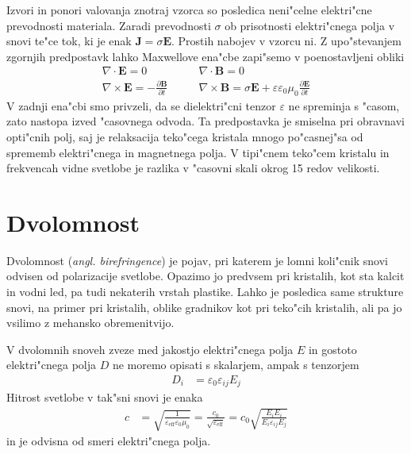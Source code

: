 \documentclass[12pt,twoside,openright,final]{report}
\newcommand{\odvod}[2]{\frac{\partial #1}{\partial #2}}
\renewcommand{\vec}{\mathbf}
\newcommand{\angl}[1]{(\textit{angl. #1})}
\begin{document}
Izvori in ponori valovanja znotraj vzorca so posledica neni"celne elektri"cne prevodnosti materiala.
Zaradi prevodnosti $\sigma$ ob prisotnosti elektri"cnega polja v snovi te"ce tok, ki je enak $\vec J = \sigma \vec E$. 
Prostih nabojev v vzorcu ni. Z upo"stevanjem zgornjih predpostavk lahko Maxwellove ena"cbe zapi"semo v poenostavljeni obliki
\begin{equation}
  \begin{aligned}
  \nabla \cdot \vec E = 0 & \qquad \nabla \cdot \vec B = 0 \\
  \nabla \times \vec E = -\odvod{\vec B}{t} & \qquad \nabla \times \vec B = \sigma \vec E + \varepsilon\varepsilon_0\mu_0\odvod{\vec E}{t}
  \end{aligned}
\end{equation}
V zadnji ena"cbi smo privzeli, da se dielektri"cni tenzor $\varepsilon$ ne spreminja s "casom, zato nastopa izved "casovnega odvoda. 
Ta predpostavka je smiselna pri obravnavi opti"cnih polj, saj je relaksacija teko"cega kristala mnogo po"casnej"sa od sprememb elektri"cnega in magnetnega polja. 
V tipi"cnem teko"cem kristalu in frekvencah vidne svetlobe je razlika v "casovni skali okrog 15 redov velikosti. 

\section{Dvolomnost}
Dvolomnost \angl{birefringence} je pojav, pri katerem je lomni koli"cnik snovi odvisen od polarizacije svetlobe\cite{landau-lifsic-optics, wiki:birefringence}. 
Opazimo jo predvsem pri kristalih, kot sta kalcit in vodni led, pa tudi nekaterih vrstah plastike. 
Lahko je posledica same strukture snovi, na primer pri kristalih, oblike gradnikov kot pri teko"cih kristalih, ali pa jo vsilimo z mehansko obremenitvijo. 

V dvolomnih snoveh zveze med jakostjo elektri"cnega polja $E$ in gostoto elektri"cnega polja $D$ ne moremo opisati s skalarjem, ampak s tenzorjem
\begin{align}
  D_i &= \varepsilon_0 \varepsilon_{ij} E_j
\end{align}
Hitrost svetlobe v tak"sni snovi je enaka
\begin{align}
  c &= \sqrt{\frac{1}{\varepsilon_{\mathrm{eff}} \varepsilon_0 \mu_0}} = \frac{c_0}{\sqrt{\varepsilon_{\mathrm{eff}}}} = c_0\sqrt{\frac{E_iE_i}{E_i \varepsilon_{ij} E_j}}
\end{align}
in je odvisna od smeri elektri"cnega polja. 
\end{document}
